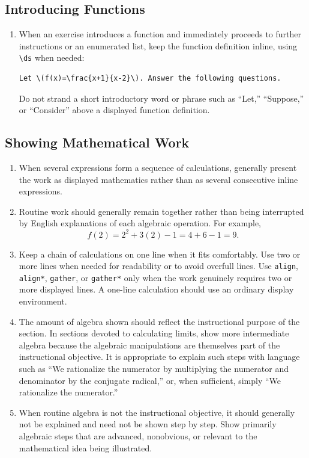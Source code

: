 \documentclass[document,notitlepage]{mhdocument}
\begin{document}
\subsection{Introducing Functions}

\begin{enumerate}[resume]
\item When an exercise introduces a function and immediately proceeds to further instructions or an enumerated list, keep the function definition inline, using \verb|\ds| when needed:
\begin{verbatim}
Let \(f(x)=\frac{x+1}{x-2}\). Answer the following questions.
\end{verbatim}
Do not strand a short introductory word or phrase such as ``Let,'' ``Suppose,'' or ``Consider'' above a displayed function definition.
\end{enumerate}

\subsection{Showing Mathematical Work}

\begin{enumerate}[resume]
\item When several expressions form a sequence of calculations, generally present the work as displayed mathematics rather than as several consecutive inline expressions.

\item Routine work should generally remain together rather than being interrupted by English explanations of each algebraic operation. For example,
\[
f(2)=2^2+3(2)-1=4+6-1=9.
\]

\item Keep a chain of calculations on one line when it fits comfortably. Use two or more lines when needed for readability or to avoid overfull lines. Use \texttt{align}, \texttt{align*}, \texttt{gather}, or \texttt{gather*} only when the work genuinely requires two or more displayed lines. A one-line calculation should use an ordinary display environment.

\item The amount of algebra shown should reflect the instructional purpose of the section. In sections devoted to calculating limits, show more intermediate algebra because the algebraic manipulations are themselves part of the instructional objective. It is appropriate to explain such steps with language such as ``We rationalize the numerator by multiplying the numerator and denominator by the conjugate radical,'' or, when sufficient, simply ``We rationalize the numerator.''

\item When routine algebra is not the instructional objective, it should generally not be explained and need not be shown step by step. Show primarily algebraic steps that are advanced, nonobvious, or relevant to the mathematical idea being illustrated.
\end{enumerate}
\end{document}
